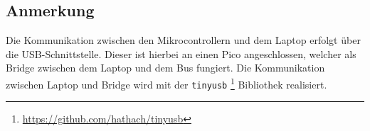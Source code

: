 \subsection{Anmerkung}\label{text:Methodik:Kommunikation:Anmerkung}

Die Kommunikation zwischen den Mikrocontrollern und dem Laptop erfolgt über die USB-Schnittstelle. Dieser ist hierbei an einen Pico angeschlossen, welcher als Bridge zwischen dem Laptop und dem Bus fungiert. Die Kommunikation zwischen Laptop und Bridge wird mit der \lstinline{tinyusb} \footnote{\url{https://github.com/hathach/tinyusb}} Bibliothek realisiert. 

